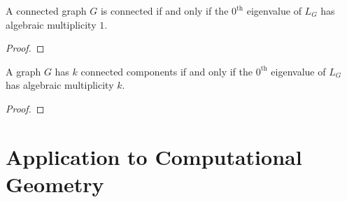 \documentclass[12pt]{article}
\begin{document}
\begin{lemma}
    A connected graph $G$ is connected if and only if the $0^\text{th}$ eigenvalue of $L_G$ has algebraic multiplicity $1$.
\end{lemma}
\begin{proof}
\end{proof}

\begin{theorem}
    A graph $G$ has $k$ connected components if and only if the $0^\text{th}$ eigenvalue of $L_G$ has algebraic multiplicity $k$.
\end{theorem}

\begin{proof}
    
\end{proof}

\section{Application to Computational Geometry}
\begin{figure}
    \centering
\end{figure}
\end{document}

